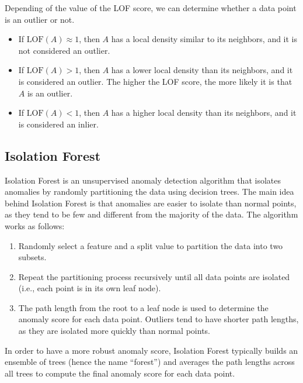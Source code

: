 Depending of the value of the LOF score, we can determine whether a data point is an outlier or not.
\begin{itemize}
    \item If $\text{LOF}(A) \approx 1$, then $A$ has a local density similar to its neighbors, and it is not considered an outlier.
    \item If $\text{LOF}(A) > 1$, then $A$ has a lower local density than its neighbors, and it is considered an outlier. The higher the LOF score, the more likely it is that $A$ is an outlier.
    \item If $\text{LOF}(A) < 1$, then $A$ has a higher local density than its neighbors, and it is considered an inlier.
\end{itemize}

\subsection{Isolation Forest}

Isolation Forest is an unsupervised anomaly detection algorithm that isolates anomalies by randomly partitioning the data using decision trees. The main idea behind Isolation Forest is that anomalies are easier to isolate than normal points, as they tend to be few and different from the majority of the data. The algorithm works as follows:
\begin{enumerate}
    \item Randomly select a feature and a split value to partition the data into two subsets.
    \item Repeat the partitioning process recursively until all data points are isolated (i.e., each point is in its own leaf node).
    \item The path length from the root to a leaf node is used to determine the anomaly score for each data point. Outliers tend to have shorter path lengths, as they are isolated more quickly than normal points.
\end{enumerate}

In order to have a more robust anomaly score, Isolation Forest typically builds an ensemble of trees (hence the name ``forest'') and averages the path lengths across all trees to compute the final anomaly score for each data point.



